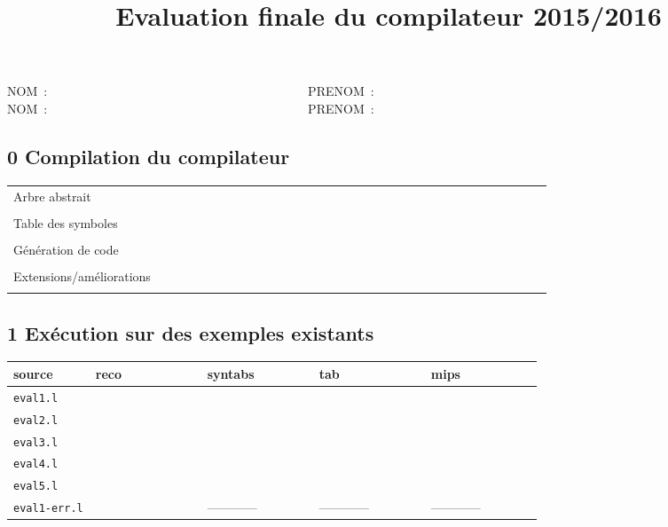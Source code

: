 \documentclass[12pt,a4paper]{article}
\title{\vspace{-1em}Evaluation finale du compilateur 2015/2016\vspace{-1em}}
\date{}
\begin{document}
\setlength{\parindent}{0cm}

\maketitle

\thispagestyle{fancy}

NOM~:~~~~~~~~~~~~~~~~~~~~~~~~~~~~~~~~~~~~~~~~~~PRENOM~:\\
NOM~:~~~~~~~~~~~~~~~~~~~~~~~~~~~~~~~~~~~~~~~~~~PRENOM~:\\




\subsection*{0 Compilation du compilateur}

\begin{longtable}{|l|l|} \hline
Arbre abstrait & ~~~~~~~~~~~~~~~~~~~~~~~~~~~~~~~~~~~ ~~~~~~~~~~~~~~~~~~~~~~~~~\\ 
& \\\hline
Table des symboles & \\ 
& \\\hline
Génération de code & \\ 
& \\\hline
Extensions/améliorations & \\ 
& \\\hline
\end{longtable}

\subsection*{1 Exécution sur des exemples existants}

\begin{longtable}{|p{2.5cm}|l|l|l|l|} \hline
source       & reco & syntabs & tab & mips \\ \hline
\endhead
{\tt eval1.l} &~~~~~~~~~~~~~~~~  &~~~~~~~~~~~~~~~~     &~~~~~~~~~~~~~~~~      &~~~~~~~~~~~~~~~~         \\ \hline
{\tt eval2.l} &      &      &      &         \\ \hline
{\tt eval3.l} &      &      &      &         \\ \hline
{\tt eval4.l} &      &      &      &         \\ \hline
{\tt eval5.l} &      &      &      &         \\ \hline \hline
{\tt eval1-err.l} &      & ------------ & ------------ &  ------------    \\ \hline
\end{longtable}
\end{document}
